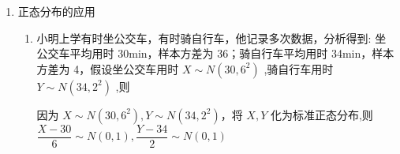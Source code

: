 \begin{enumerate}
\begin{enumerate}
\begin{jieda}
            所以 $P\left( {X < \mu  - \sigma }\right)  = P\left( {X > \mu  + \sigma }\right)  = \dfrac{1 - P\left( {\left| {X - \mu }\right|  \leq  \sigma }\right) }{2} = {0.16}$
            
            $P\left( {X < {87}}\right)  = P\left( {X > {103}}\right)  = \dfrac{1 - P\left( {\left| {X - \mu }\right|  \leq  \sigma }\right) }{2} = {0.16}$
            
            ,而 $P\left( {\mu  - \sigma  < X < \mu }\right)  = P\left( {\mu  < X < \mu  + \sigma }\right)  = {0.34}$ ,即 $P\left( {{87} < X < {95}}\right)  = P\left( {{95} < X < {103}}\right)  = {0.34}$ , 故 $X > {103}$ 为 $A$ 等级, ${95} < X < {103}$ 为 $B$ 等级, ${87} < X < {95}$ 为 $C$ 等级, $X < {87}$ 为 $D$ 等级, 故 105 分为 $A$ 等级.
        \end{jieda}
        
        \item 某次高二质量抽测中,学生的数学成绩 $X$ 服从正态分布 $N$ (96,144). 已知参加本次考试的学生约有 10000 人，如果小明在这次考试中数学成绩为 120 分，则小明的数学成绩在本次抽测的名次大约是第名. 附:若 $X \sim  N\left( {\mu ,{\sigma }^{2}}\right)$ ,则 $P\left( {\mu  - \sigma  < X < \mu  + \sigma }\right)  = {0.6827},P\left( {\mu  - {2\sigma } < X < \mu  + {2\sigma }}\right)  = {0.9545}$
        \begin{jieda}
            由 $X \sim  N\left( {{96},{144}}\right) ,\mu  + {2\sigma } = {96} + {24} = {120},\mu  - {2\sigma } = {96} - {24} = {72}$，则 $P\left( {{72} < X < {120}}\right)  = {0.9545}$ ,故 $P\left( {X \geq  {120}}\right)  = \dfrac{1 - {0.9545}}{2} = {0.02275}$，${10000} \times  {0.02275} = {227.5} \approx  {228}$ ，故小明的数学成绩在本次抽测的名次大约是第 228 名.
        \end{jieda}
    \end{enumerate}
    \item 正态分布的应用
    \begin{enumerate}
        \item 小明上学有时坐公交车，有时骑自行车，他记录多次数据，分析得到: 坐公交车平均用时 30min，样本方差为 36；骑自行车平均用时 34min，样本方差为 4，假设坐公交车用时 $X \sim  N\left( {{30},{6}^{2}}\right)$ ,骑自行车用时 $Y \sim  N\left( {{34},{2}^{2}}\right)$ ,则
        \begin{jieda}
            因为 $X \sim  N\left( {{30},{6}^{2}}\right) ,Y \sim  N\left( {{34},{2}^{2}}\right)$，将 $X,Y$ 化为标准正态分布,则 $\dfrac{X - {30}}{6} \sim  N\left( {0,1}\right) ,\dfrac{Y - {34}}{2} \sim  N\left( {0,1}\right)$
            

\end{jieda}
\end{enumerate}
\end{enumerate}
